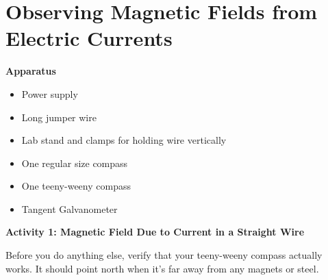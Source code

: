\section{Observing Magnetic Fields from Electric Currents}

\makelabheader %


\bigskip
\textbf{Apparatus} 

\begin{itemize} [nosep]
\item Power supply
\item Long jumper wire 
\item Lab stand and clamps for holding wire vertically
\item One regular size compass
\item One teeny-weeny compass
\item Tangent Galvanometer
\end{itemize}

\bigskip
\textbf{Activity 1: Magnetic Field Due to Current in a Straight Wire}

Before you do anything else, verify that your teeny-weeny compass actually works.  It should point north when it's far away from any magnets or steel.  

